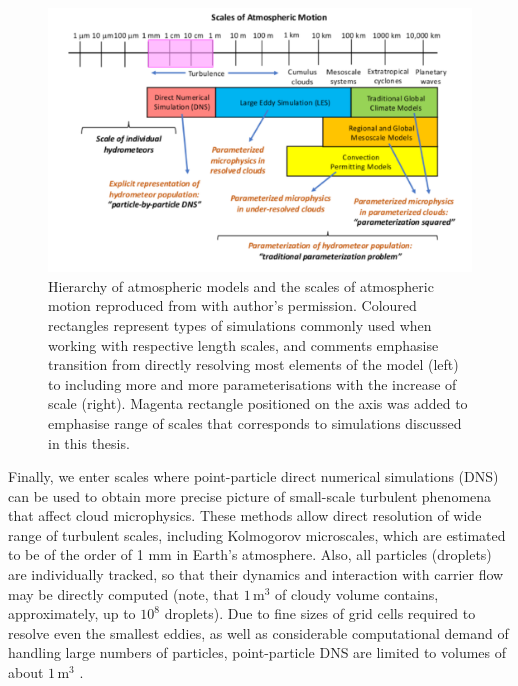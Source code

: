 \documentclass{pracamgren}
\begin{document}
\begin{figure}[h]
\centering
\includegraphics[width=13cm]{figures/0-01_atmo-scales.png}
\caption{
Hierarchy of atmospheric models and the scales of atmospheric motion reproduced from \textcite{Morrison2020} with author's permission.
Coloured rectangles represent types of simulations commonly used when working with respective length scales, and comments emphasise transition from directly resolving most elements of the model (left) to including more and more parameterisations with the increase of scale (right).
Magenta rectangle positioned on the axis was added to emphasise range of scales that corresponds to simulations discussed in this thesis.
}
\label{fig:atmo-scales}
\end{figure}

Finally, we enter scales where point-particle direct numerical simulations (DNS) can be used to obtain more precise picture of small-scale turbulent phenomena that affect cloud microphysics.
These methods allow direct resolution of wide range of turbulent scales, including Kolmogorov microscales, which are estimated to be of the order of 1 mm in Earth's atmosphere.
Also, all particles (droplets) are individually tracked, so that their dynamics and interaction with carrier flow may be directly computed (note, that $1 \, \text{m}^{3}$ of cloudy volume contains, approximately, up to $10^{8}$ droplets).
Due to fine sizes of grid cells required to resolve even the smallest eddies, as well as considerable computational demand of handling large numbers of particles, point-particle DNS are limited to volumes of about $1 \, \text{m}^{3}$ \parencite{Morrison2020}.
\end{document}

